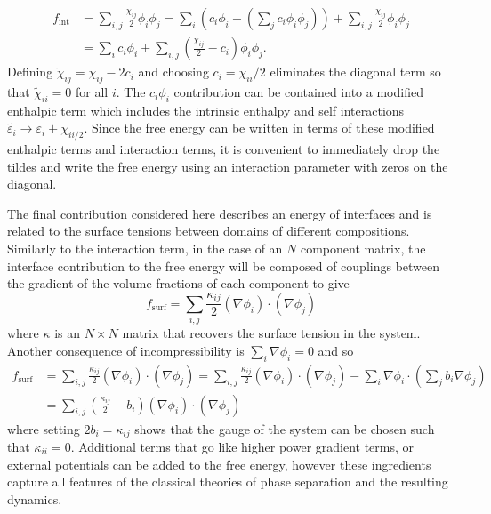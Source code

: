 \begin{equation}
\begin{split}
    f_\text{int} &= \sum_{i, j}\frac{\chi_{ij}}{2}\phi_i\phi_j = \sum_{i}\left(c_i\phi_i-\left(\sum_j c_i\phi_i\phi_j\right)\right) + \sum_{i, j}\frac{\chi_{ij}}{2}\phi_i\phi_j \\
    &= \sum_{i}c_i\phi_i + \sum_{i,j}\left(\frac{\chi_{ij}}{2}-c_i\right)\phi_i\phi_j.
\end{split}
\end{equation}
Defining $\tilde{\chi}_{ij}=\chi_{ij}-2c_i$ and choosing $c_i = \chi_{ii}/2$ eliminates the diagonal term so that $\tilde{\chi}_{ii} = 0$ for all $i$. The $c_i\phi_i$ contribution can be contained into a modified enthalpic term which includes the intrinsic enthalpy and self interactions $\tilde{\varepsilon_i} \rightarrow \varepsilon_i + \chi_{ii/2}$. Since the free energy can be written in terms of these modified enthalpic terms and interaction terms, it is convenient to immediately drop the tildes and write the free energy using an interaction parameter with zeros on the diagonal.

The final contribution considered here describes an energy of interfaces and is related to the surface tensions between domains of different compositions. Similarly to the interaction term, in the case of an $N$ component matrix, the interface contribution to the free energy will be composed  of couplings between the gradient of the volume fractions of each component to give
\begin{equation}
    f_\text{surf} = \sum_{i, j}\frac{\kappa_{ij}}{2}(\nabla\phi_i)\cdot(\nabla\phi_j)
\end{equation}
where $\kappa$ is an $N \times N$ matrix that recovers the surface tension in the system. Another consequence of incompressibility is $\sum_{i}\nabla\phi_i = 0$ and so
\begin{equation}
\begin{split}
    f_\text{surf} &= \sum_{i,j}\frac{\kappa_{ij}}{2}\left(\nabla\phi_i\right)\cdot\left(\nabla\phi_j\right) = \sum_{i,j}\frac{\kappa_{ij}}{2}\left(\nabla\phi_i\right)\cdot\left(\nabla\phi_j\right) - \sum_{i}\nabla\phi_i\cdot\left(\sum_j b_i\nabla\phi_j\right) \\
    &= \sum_{i,j}\left(\frac{\kappa_{ij}}{2} - b_i \right)\left(\nabla\phi_i\right)\cdot\left(\nabla\phi_j\right)
\end{split}
\end{equation}
where setting $2b_i = \kappa_{ij}$ shows that the gauge of the system can be chosen such that $\kappa_{ii} = 0$. Additional terms that go like higher power gradient terms, or external potentials can be added to the free energy, however these ingredients capture all features of the classical theories of phase separation and the resulting dynamics.

